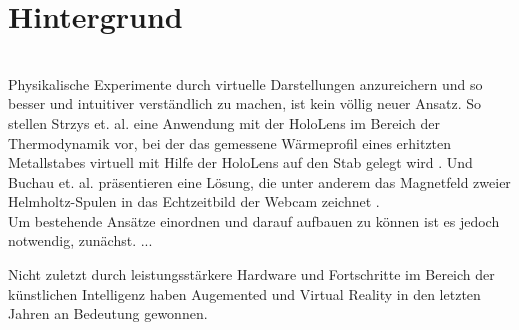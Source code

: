 \section{Hintergrund}
\label{sec-2}
\\


Physikalische Experimente durch virtuelle Darstellungen anzureichern und so besser und intuitiver verständlich zu machen, ist kein völlig neuer Ansatz. So stellen Strzys et. al. eine Anwendung mit der HoloLens im Bereich der Thermodynamik vor, bei der das gemessene Wärmeprofil eines erhitzten Metallstabes virtuell mit Hilfe der HoloLens auf den Stab gelegt wird \cite{Strzys17}. Und Buchau et. al. präsentieren eine Lösung, die unter anderem das Magnetfeld zweier Helmholtz-Spulen in das Echtzeitbild der Webcam zeichnet \cite{Buchau09}.\\

Um bestehende Ansätze einordnen und darauf aufbauen zu können ist es jedoch notwendig, zunächst. ...


Nicht zuletzt durch leistungsstärkere Hardware und Fortschritte im Bereich der künstlichen Intelligenz haben Augemented und Virtual Reality in den letzten Jahren an Bedeutung gewonnen. 